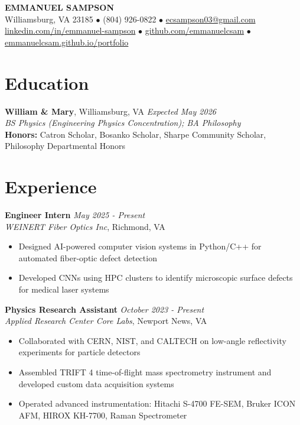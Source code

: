 \documentclass[11pt,letterpaper]{article}
\newcommand{\daterange}[1]{\textit{\color{secondary}#1}}
\newcommand{\position}[1]{\textbf{#1}}
\newcommand{\organization}[1]{\textit{#1}}
\begin{document}
\begin{center}
    \color{primary}
    {\LARGE\bfseries EMMANUEL SAMPSON}\\[3pt]
    \color{black}
    \small
    Williamsburg, VA 23185 \quad $\bullet$ \quad
    (804) 926-0822 \quad $\bullet$ \quad
    \href{mailto:ecsampson03@gmail.com}{ecsampson03@gmail.com}\\
    \href{https://linkedin.com/in/emmanuel-sampson}{linkedin.com/in/emmanuel-sampson} \quad $\bullet$ \quad
    \href{https://github.com/emmanuelcsam}{github.com/emmanuelcsam} \quad $\bullet$ \quad
    \href{https://emmanuelcsam.github.io/portfolio}{emmanuelcsam.github.io/portfolio}
\end{center}

\vspace{-8pt}

\section{Education}

\noindent
\textbf{William \& Mary}, Williamsburg, VA \hfill \daterange{Expected May 2026}\\
\organization{BS Physics (Engineering Physics Concentration); BA Philosophy}\\
\textbf{Honors:} Catron Scholar, Bosanko Scholar, Sharpe Community Scholar, Philosophy Departmental Honors

\section{Experience}

\noindent
\position{Engineer Intern} \hfill \daterange{May 2025 - Present}\\
\organization{WEINERT Fiber Optics Inc}, Richmond, VA
\begin{itemize}
    \item Designed AI-powered computer vision systems in Python/C++ for automated fiber-optic defect detection
    \item Developed CNNs using HPC clusters to identify microscopic surface defects for medical laser systems
\end{itemize}

\vspace{3pt}
\noindent
\position{Physics Research Assistant} \hfill \daterange{October 2023 - Present}\\
\organization{Applied Research Center Core Labs}, Newport News, VA
\begin{itemize}
    \item Collaborated with CERN, NIST, and CALTECH on low-angle reflectivity experiments for particle detectors
    \item Assembled TRIFT 4 time-of-flight mass spectrometry instrument and developed custom data acquisition systems
    \item Operated advanced instrumentation: Hitachi S-4700 FE-SEM, Bruker ICON AFM, HIROX KH-7700, Raman Spectrometer
\end{itemize}
\end{document}
